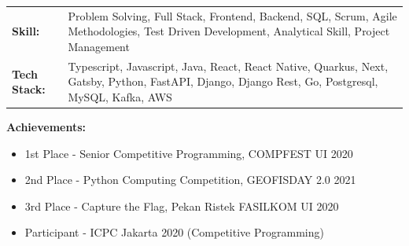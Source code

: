 \documentclass[a4paper,10pt]{article}
\begin{document}
\begin{tabularx}{\textwidth}{@{}lX@{}}
\textbf{Skill:} & Problem Solving, Full Stack, Frontend, Backend, SQL, Scrum, Agile Methodologies, Test Driven Development, Analytical Skill, Project Management \\
\textbf{Tech Stack:} & Typescript, Javascript, Java, React, React Native, Quarkus, Next, Gatsby, Python, FastAPI, Django, Django Rest, Go, Postgresql, MySQL, Kafka, AWS \\
\end{tabularx}
\textbf{Achievements:}
\begin{itemize}
    \item 1st Place - Senior Competitive Programming, COMPFEST UI 2020
    \item 2nd Place - Python Computing Competition, GEOFISDAY 2.0 2021
    \item 3rd Place - Capture the Flag, Pekan Ristek FASILKOM UI 2020
    \item Participant - ICPC Jakarta 2020 (Competitive Programming)
\end{itemize}
\end{document}
